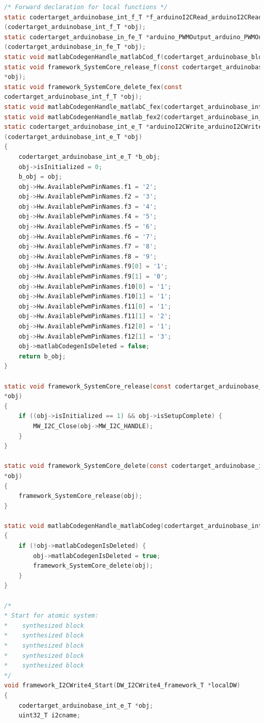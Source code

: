 \begin{lstlisting}[caption={Automatically generated C code}, language=c,label={lst:acg}]
/* Forward declaration for local functions */
static codertarget_arduinobase_int_f_T *f_arduinoI2CRead_arduinoI2CRead
(codertarget_arduinobase_int_f_T *obj);
static codertarget_arduinobase_in_fe_T *arduino_PWMOutput_arduino_PWMOu
(codertarget_arduinobase_in_fe_T *obj);
static void matlabCodegenHandle_matlabCod_f(codertarget_arduinobase_block_T *obj);
static void framework_SystemCore_release_f(const codertarget_arduinobase_int_f_T
*obj);
static void framework_SystemCore_delete_fex(const
codertarget_arduinobase_int_f_T *obj);
static void matlabCodegenHandle_matlabC_fex(codertarget_arduinobase_int_f_T *obj);
static void matlabCodegenHandle_matlab_fex2(codertarget_arduinobase_in_fe_T *obj);
static codertarget_arduinobase_int_e_T *arduinoI2CWrite_arduinoI2CWrite
(codertarget_arduinobase_int_e_T *obj)
{
	codertarget_arduinobase_int_e_T *b_obj;
	obj->isInitialized = 0;
	b_obj = obj;
	obj->Hw.AvailablePwmPinNames.f1 = '2';
	obj->Hw.AvailablePwmPinNames.f2 = '3';
	obj->Hw.AvailablePwmPinNames.f3 = '4';
	obj->Hw.AvailablePwmPinNames.f4 = '5';
	obj->Hw.AvailablePwmPinNames.f5 = '6';
	obj->Hw.AvailablePwmPinNames.f6 = '7';
	obj->Hw.AvailablePwmPinNames.f7 = '8';
	obj->Hw.AvailablePwmPinNames.f8 = '9';
	obj->Hw.AvailablePwmPinNames.f9[0] = '1';
	obj->Hw.AvailablePwmPinNames.f9[1] = '0';
	obj->Hw.AvailablePwmPinNames.f10[0] = '1';
	obj->Hw.AvailablePwmPinNames.f10[1] = '1';
	obj->Hw.AvailablePwmPinNames.f11[0] = '1';
	obj->Hw.AvailablePwmPinNames.f11[1] = '2';
	obj->Hw.AvailablePwmPinNames.f12[0] = '1';
	obj->Hw.AvailablePwmPinNames.f12[1] = '3';
	obj->matlabCodegenIsDeleted = false;
	return b_obj;
}

static void framework_SystemCore_release(const codertarget_arduinobase_int_e_T
*obj)
{
	if ((obj->isInitialized == 1) && obj->isSetupComplete) {
		MW_I2C_Close(obj->MW_I2C_HANDLE);
	}
}

static void framework_SystemCore_delete(const codertarget_arduinobase_int_e_T
*obj)
{
	framework_SystemCore_release(obj);
}

static void matlabCodegenHandle_matlabCodeg(codertarget_arduinobase_int_e_T *obj)
{
	if (!obj->matlabCodegenIsDeleted) {
		obj->matlabCodegenIsDeleted = true;
		framework_SystemCore_delete(obj);
	}
}

/*
* Start for atomic system:
*    synthesized block
*    synthesized block
*    synthesized block
*    synthesized block
*    synthesized block
*/
void framework_I2CWrite4_Start(DW_I2CWrite4_framework_T *localDW)
{
	codertarget_arduinobase_int_e_T *obj;
	uint32_T i2cname;
	

\end{lstlisting}
